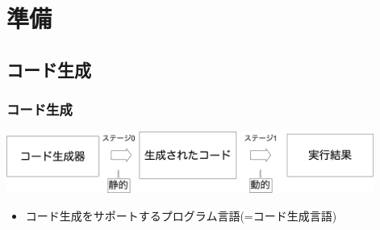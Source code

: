 \section{準備}

\subsection{コード生成}
\begin{frame}
  \frametitle{コード生成}
  \medskip
  \flushleft
  \includegraphics[clip,height=2cm]{./img/prggen.png}

  \begin{itemize}
  \item コード生成をサポートするプログラム言語(=\alert{コード生成言語})
  \end{itemize}
\end{frame}


